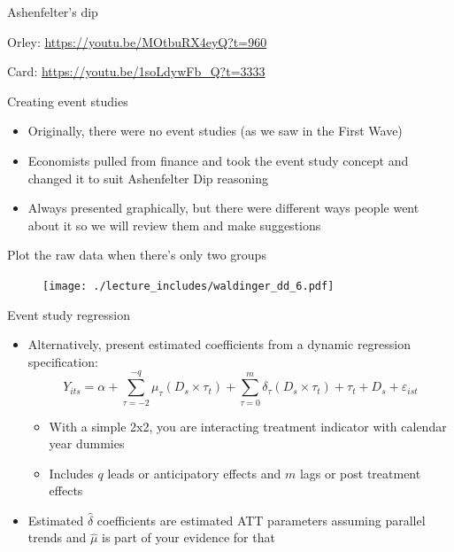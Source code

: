 \documentclass{beamer}
\begin{document}
\begin{frame}{Ashenfelter's dip}

Orley: \url{https://youtu.be/MOtbuRX4eyQ?t=960}

Card: \url{https://youtu.be/1soLdywFb_Q?t=3333}

\end{frame}


\begin{frame}{Creating event studies}

\begin{itemize}

\item Originally, there were no event studies (as we saw in the First Wave)
\item Economists pulled from finance and took the event study concept and changed it to suit Ashenfelter Dip reasoning
\item Always presented graphically, but there were different ways people went about it so we will review them and make suggestions

\end{itemize}

\end{frame}



\begin{frame}{Plot the raw data when there's only two groups}

	\begin{figure}
	\texttt{[image: ./lecture\_includes/waldinger\_dd\_6.pdf]}
	\end{figure}

\end{frame}


\begin{frame}{Event study regression}
	
	\begin{itemize}
	\item Alternatively, present estimated coefficients from a dynamic regression specification:
 $$Y_{its} = \alpha + \sum_{\tau=-2}^{-q}\mu_{\tau} (D_s \times \tau_t) + \sum_{\tau=0}^m\delta_{\tau} (D_s \times \tau_t) + \tau_t + D_s + \varepsilon_{ist}$$
		\begin{itemize}
		\item With a simple 2x2, you are interacting treatment indicator with calendar year dummies
		\item Includes $q$ leads or anticipatory effects and $m$ lags or post treatment effects
		\end{itemize}
	\item Estimated $\widehat{\delta}$ coefficients are estimated ATT parameters assuming parallel trends and $\widehat{\mu}$ is part of your evidence for that
	\end{itemize}
\end{frame}
\end{document}
